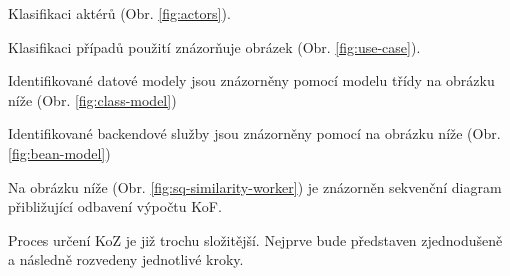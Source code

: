 
Klasifikaci aktérů (Obr. \ref{fig:actors}).

Klasifikaci případů použití znázorňuje obrázek (Obr. \ref{fig:use-case}).



Identifikované datové modely jsou znázorněny pomocí modelu třídy na obrázku níže (Obr. \ref{fig:class-model})

Identifikované backendové služby jsou znázorněny pomocí na obrázku níže (Obr. \ref{fig:bean-model})


Na obrázku níže (Obr. \ref{fig:sq-similarity-worker}) je znázorněn sekvenční diagram přibližující odbavení výpočtu KoF.





Proces určení KoZ je již trochu složitější. Nejprve bude představen zjednodušeně a následně rozvedeny jednotlivé kroky.

